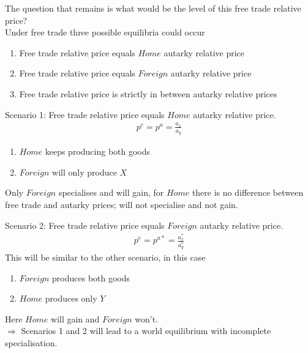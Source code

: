 \documentclass{beamer}
\begin{document}
\begin{frame}
  The question that remains is what would be the level of this free trade relative price?\\
  Under free trade three possible equilibria could occur
  \medskip
  \begin{enumerate}
    \item Free trade relative price equals $Home$ autarky relative price
    \item Free trade relative price equals $Foreign$ autarky relative price
    \item Free trade relative price is strictly in between autarky relative prices
  \end{enumerate}
\end{frame}

\begin{frame}
  Scenario 1: Free trade relative price equals $Home$ autarky relative price.
  \begin{align*}
   p^e=p^a=\frac{a_x}{a_y}
  \end{align*}
  \medskip
  \begin{enumerate}
    \item $Home$ keeps producing both goods
    \item $Foreign$ will only produce $X$
  \end{enumerate}
  \medskip
  Only $Foreign$ specialises and will gain, for $Home$ there is no difference between free trade and autarky prices; will not specialise and not gain.
\end{frame}

\begin{frame}
  Scenario 2: Free trade relative price equals $Foreign$ autarky relative price.
  \begin{align*}
   p^e=p^{a*}=\frac{a^*_x}{a^*_y}
  \end{align*}
  This will be similar to the other scenario, in this case
  \medskip
  \begin{enumerate}
    \item $Foreign$ produces both goods
    \item $Home$ produces only $Y$
  \end{enumerate}
  \medskip
  Here $Home$ will gain and $Foreign$ won't.\\   \medskip
  $\Rightarrow$ Scenarios 1 and 2 will lead to a world equilibrium with incomplete specialisation.
\end{frame}
\end{document}
